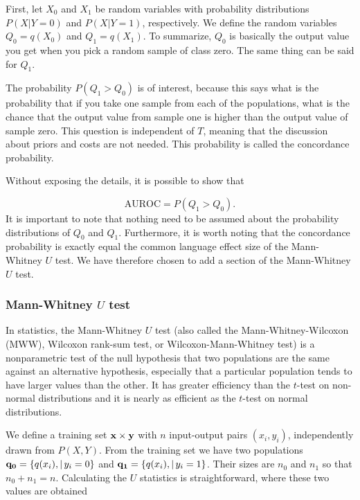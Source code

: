 First, let $X_0$ and $X_1$ be random variables with probability distributions $P(X | Y = 0)$ and $P(X | Y = 1)$, respectively.  We define the random variables $Q_0 = q(X_0)$ and $Q_1 = q(X_1)$.  To summarize, $Q_0$ is basically the output value you get when you pick a random sample of class zero. The same thing can be said for $Q_1$.  

The probability $P(Q_1 > Q_0)$ is of interest, because this says what is the probability that if you take one sample from each of the populations, what is the chance that the output value from sample one is higher than the output value of sample zero.  This question is independent of $T$, meaning that the discussion about priors and costs are not needed. This probability is called the concordance probability.

Without exposing the details, it is possible to show that 

\begin{equation}
\label{eq:concurrent}
\mbox{AUROC} = P(Q_1 > Q_0).
\end{equation}
It is important to note that nothing need to be assumed about the probability distributions of $Q_0$ and $Q_1$.  Furthermore, it is worth noting that the concordance probability is exactly equal the common language effect size of the Mann-Whitney $U$ test.  We have therefore chosen to add a section of the Mann-Whitney $U$ test.

\subsubsection{Mann-Whitney $U$ test}
\label{sec:U}

In statistics, the Mann-Whitney $U$ test (also called the Mann-Whitney-Wilcoxon (MWW), Wilcoxon rank-sum test, or Wilcoxon-Mann-Whitney test) is a nonparametric test of the null hypothesis that two populations are the same against an alternative hypothesis, especially that a particular population tends to have larger values than the other.  It has greater efficiency than the $t$-test on non-normal distributions and it is nearly as efficient as the $t$-test on normal distributions.

We define a training set $\bu{x} \times \bv{y}$ with $n$ input-output pairs $(x_i, y_i)$, independently drawn from $P(X,Y)$.  From the training set we have two populations $\bv{q_0} = \{q(x_i) , | \, y_i = 0 \}$ and $\bv{q_1} = \{q(x_i) , | \, y_i = 1 \}$.  Their sizes are $n_0$ and $n_1$ so that $n_0 + n_1 = n$.  Calculating the $U$ statistics is straightforward, where these two values are obtained 

